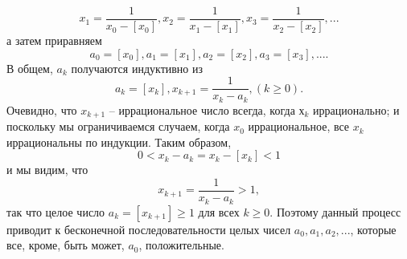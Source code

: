 \documentclass[a4paper,12pt]{article}
\theoremstyle{definition}
\begin{document}
	\[x_1=\frac{1}{x_0-[x_0]}, x_2=\frac{1}{x_1-[x_1]}, x_3=\frac{1}{x_2-[x_2]}, ...\]
	а затем приравняем
	\[a_0=[x_0], a_1=[x_1], a_2=[x_2], a_3=[x_3], ... .\]
	В общем, $a_k$ получаются индуктивно из	\[a_k=[x_k], x_{k+1}=\frac{1}{x_k-a_k}, (k\geq0).\]
	Очевидно, что $x_{k+1}$ -- иррациональное число всегда, когда $х_k$ иррационально; и поскольку мы ограничиваемся случаем, когда $x_0$ иррациональное, все $x_k$ иррациональны по индукции. Таким образом,
	\[0<x_k-a_k=x_k-[x_k]<1\]
	и мы видим, что
	\[x_{k+1}=\frac{1}{x_k-a_k}>1,\]
	так что целое число $a_k=[x_{k+1}]\geq1$ для всех $k\geq$0. Поэтому данный процесс приводит к бесконечной последовательности целых чисел $a_0, a_1, a_2, ...$, которые все, кроме, быть может,  $a_0$, положительные.
\end{document}
